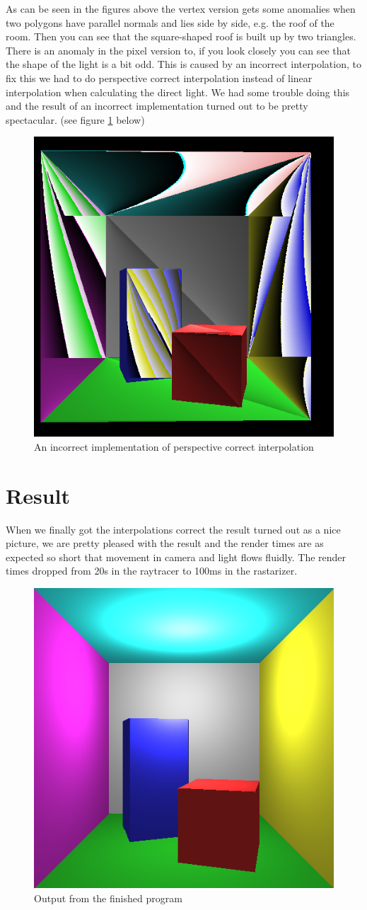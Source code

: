 \documentclass[a4paper,11pt]{article}
\begin{document}
As can be seen in the figures above the vertex version gets some anomalies when two polygons have parallel normals and lies side by side, e.g. the roof of the room. Then you can see that the square-shaped roof is built up by two triangles. There is an anomaly in the pixel version to, if you look closely you can see that the shape of the light is a bit odd. This is caused by an incorrect interpolation, to fix this we had to do perspective correct interpolation instead of linear interpolation when calculating the direct light. We had some trouble doing this and the result of an incorrect implementation turned out to be pretty spectacular. (see figure \ref{fun} below)
\begin{figure}[h!]
	\centering
	\includegraphics[width=0.3\linewidth]{fun.png}
	\caption{An incorrect implementation of perspective correct interpolation}
	\label{fun}
\end{figure}
\clearpage

\section{Result}
When we finally got the interpolations correct the result turned out as a nice picture, we are pretty pleased with the result and the render times are as expected so short that movement in camera and light flows fluidly. The render times dropped from 20s in the raytracer to 100ms in the rastarizer. 
\begin{figure}[h!]
	\centering
	\includegraphics[width=0.4\linewidth]{screenshot5.png}
	\caption{Output from the finished program}
	\label{fig5}
\end{figure}
\end{document}
